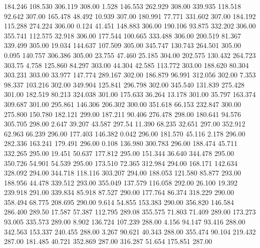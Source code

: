 184.246  108.530  306.119       308.00
   1.528  146.553  262.929       308.00
 339.935  118.518   92.642       307.00
 165.478   48.492   10.939       307.00
 180.991   77.771  331.602       307.00
 184.192  115.288  274.224       306.00
   0.124   41.451  148.883       306.00
 190.106   93.875  332.202       306.00
 355.741  112.575   32.918       306.00
 177.544  100.665  333.488       306.00
 200.519   81.367  339.499       305.00
  19.034  144.637  107.509       305.00
 345.747  130.743  264.501       305.00
   0.095  140.757  306.386       305.00
  23.755   47.460   25.185       304.00
 202.575  130.432  264.723       303.75
   4.758  125.860   84.297       303.00
  44.304   42.585  113.772       303.00
 188.620   80.304  303.231       303.00
  33.977  147.774  289.167       302.00
 186.879   96.991  312.056       302.00
   7.353   98.337  103.216       302.00
 349.904  125.841  296.798       302.00
 345.540  131.839  275.428       301.00
 182.519   80.213  324.038       301.00
 175.633   36.264   13.178       301.00
  35.797  163.374  309.687       301.00
 295.861  146.306  206.302       300.00
 351.618   66.153  232.847       300.00
 275.800  150.780  182.121       299.00
 187.211   90.406  276.478       298.00
 180.641   94.576  305.705       298.00
   2.647   39.207   43.587       297.54
  11.390   68.235   32.651       297.00
 352.912   62.963   66.239       296.00
 177.403  146.382    0.042       296.00
 181.570   45.116    2.178       296.00
 282.336  163.241  179.491       296.00
   0.108  136.980  300.783       296.00
 188.474   45.711  332.265       295.00
  19.451   50.637  177.812       295.00
 151.344   36.640  344.478       295.00
 350.726   54.901   54.539       295.00
 173.510   72.365  312.984       294.00
 168.171  142.634  328.092       294.00
 344.718  118.116  303.207       294.00
 188.053  121.580   85.877       293.00
 188.956   44.478  339.512       293.00
 355.049  137.579  116.058       292.00
  26.100   19.392  239.918       291.00
 339.834   85.918   87.527       290.00
 177.764   86.374  318.229       290.00
 358.494   68.775  208.695       290.00
   9.614   54.855  153.383       290.00
 356.820  146.584  286.400       289.50
  17.587   57.387  112.795       289.08
 355.575   71.803   71.409       289.00
 173.273   93.005  335.573       289.00
   8.902  136.724  107.239       288.00
   4.156   94.147   93.416       288.00
 342.563  153.337  240.455       288.00
   3.267   90.621   40.343       288.00
 355.474   90.104  219.432       287.00
 181.485   40.721  352.869       287.00
 316.287   51.654  175.851       287.00

